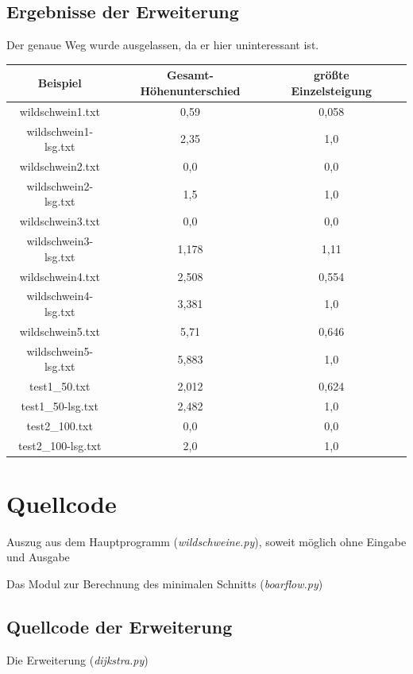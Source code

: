 \documentclass[a4paper, notitlepage, 12pt]{scrartcl}
\newenvironment{longlisting}{\captionsetup{type=listing}}{}
\begin{document}
\subsection{Ergebnisse der Erweiterung}
Der genaue Weg wurde ausgelassen, da er hier uninteressant ist.
\begin{table}[H]
    \begin{tabular}{|c|c|c|c|} 
    \hline
Beispiel & Gesamt-Höhenunterschied & größte Einzelsteigung \\ \hline
wildschwein1.txt & 0,59 & 0,058 \\
wildschwein1-lsg.txt & 2,35 & 1,0 \\
wildschwein2.txt & 0,0 & 0,0  \\
wildschwein2-lsg.txt & 1,5 & 1,0  \\
wildschwein3.txt & 0,0 & 0,0 \\
wildschwein3-lsg.txt & 1,178 & 1,11  \\
wildschwein4.txt & 2,508 & 0,554 \\
wildschwein4-lsg.txt & 3,381 & 1,0  \\
wildschwein5.txt & 5,71 & 0,646 \\
wildschwein5-lsg.txt & 5,883 & 1,0 \\
test1\_50.txt & 2,012 & 0,624 \\
test1\_50-lsg.txt & 2,482 & 1,0 \\
test2\_100.txt & 0,0 & 0,0 \\
test2\_100-lsg.txt & 2,0 & 1,0 \\ \hline
    \end{tabular}
\end{table}
 \section{Quellcode}
 \renewcommand{\listingscaption}{Quellcode}
 
 \begin{longlisting}
 \caption{Auszug aus dem Hauptprogramm (\textit{wildschweine.py}), soweit möglich ohne Eingabe und Ausgabe}
 \end{longlisting}
 
 \begin{longlisting}
 \caption{Das Modul zur Berechnung des minimalen Schnitts (\textit{boarflow.py})}
 \end{longlisting}
 
 \subsection{Quellcode der Erweiterung}
 \begin{longlisting}
 \caption{Die Erweiterung (\textit{dijkstra.py})}
 \end{longlisting}
 
\end{document}
